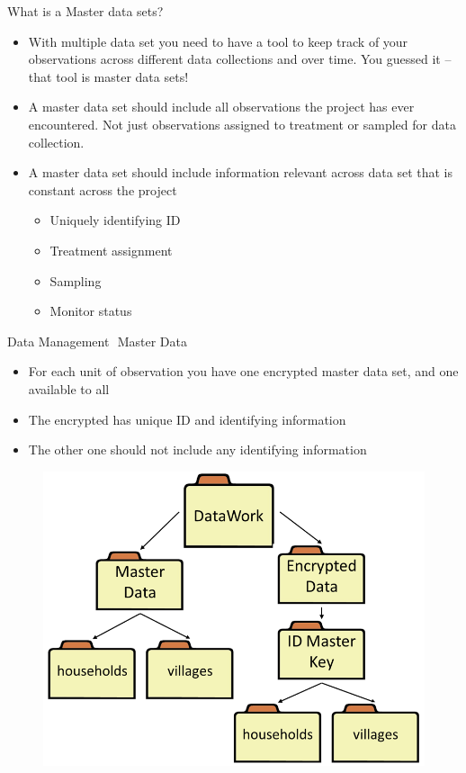 \documentclass[aspectratio=169]{beamer}
\begin{document}
\begin{frame}{What is a Master data sets?}
\begin{itemize}
	\item With multiple data set you need to have a tool to keep track of your observations across different data collections and over time. You guessed it – that tool is master data sets!
	\item A master data set should include all observations the project has ever encountered. Not just observations assigned to treatment or sampled for data collection.
	\item A master data set should include information relevant across data set that is constant across the project
	\begin{itemize}
		\item Uniquely identifying ID
		\item Treatment assignment
		\item Sampling
		\item Monitor status		
	\end{itemize}
\end{itemize}
\end{frame}


\begin{frame}[fragile]{Data Management  Master Data}
\begin{multicols}{2}	
	\begin{itemize}
		\item For each unit of observation you have one encrypted master data set, and one available to all
		\item The encrypted has unique ID and identifying information
		\item The other one should not include any identifying information
	\end{itemize}
	\begin{figure}
		\centering
		\includegraphics[width=\linewidth]{img/datamanage1}
	\end{figure}
\end{multicols}
\end{frame}
\end{document}
